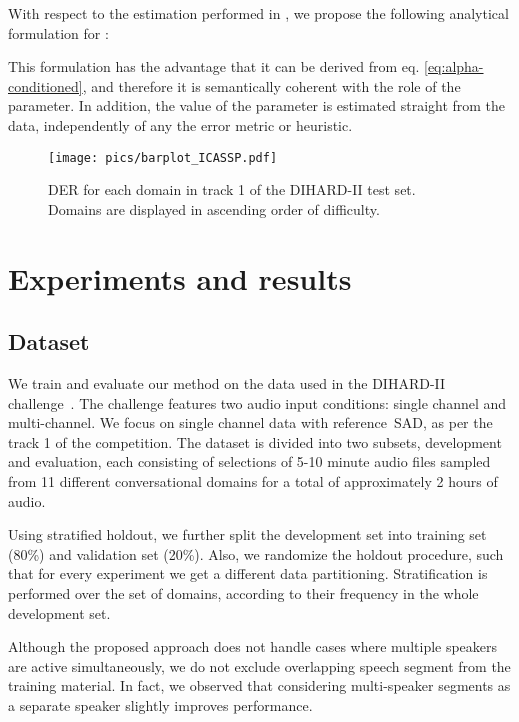 \documentclass{article}
\begin{document}
With respect to the estimation performed in \cite{zhang2019fully}, we propose the following analytical formulation for :

This formulation has the advantage that it can be derived from eq. \ref{eq:alpha-conditioned}, and therefore it is semantically coherent with the role of the parameter. In addition, the value of the parameter is estimated straight from the data, independently of any the error metric or heuristic.

\begin{figure*}[!ht]
\centering
  \texttt{[image: pics/barplot\_ICASSP.pdf]}
  \vspace{-0.15cm}
  \caption{DER for each domain in track 1 of the DIHARD-II test set. Domains are displayed in ascending order of difficulty.}
  \vspace{-0.15cm}
\label{fig:disaggDER}
\end{figure*}

\section{Experiments and results}
\label{sec:experiments}

\subsection{Dataset}
\label{sec:dataset}
We train and evaluate our method on the data used in the DIHARD-II challenge~\cite{Ryant2019}. The challenge features two audio input conditions: single channel and multi-channel. We focus on single channel data with reference~\ac{SAD}, as per the track 1 of the competition. The dataset is divided into two subsets, development and evaluation, each consisting of selections of 5-10 minute audio files sampled from 11 different conversational domains for a total of approximately 2 hours of audio.

Using stratified holdout, we further split the development set into training set (80\%) and validation set (20\%). Also, we randomize the holdout procedure, such that for every experiment we get a different data partitioning. Stratification is performed over the set of domains, according to their frequency in the whole development set.

Although the proposed approach does not handle cases where multiple speakers are active simultaneously, we do not exclude overlapping speech segment from the training material. In fact, we observed that considering multi-speaker segments as a separate speaker slightly improves performance. 
\end{document}
